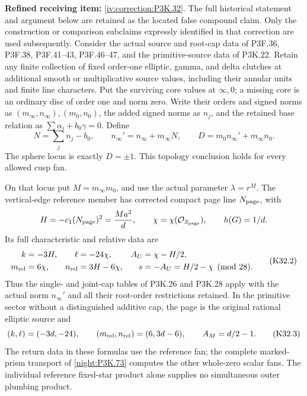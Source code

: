 \begin{theorem}\hypertarget{tag-02UD}{}\label{night:P3K.32}

\par\noindent\textbf{Refined receiving item:} \cref{iv:correction:P3K.32}. The full historical statement and argument below are retained as the located false compound claim. Only the construction or comparison subclaims expressly identified in that correction are used subsequently.
Consider the actual source and root-cap data of P3F.36, P3F.38,
P3F.41--43, P3F.46--47, and the primitive-source data of P3K.22.
Retain any finite collection of fixed order-one elliptic, gamma,
and delta clutches at additional smooth or multiplicative source
values, including their annular units and finite line characters.
Put the surviving core values at $\infty,0$; a missing core is
an ordinary disc of order one and norm zero. Write their orders
and signed norms as $(m_\infty,n_\infty),(m_0,n_0)$, the added
signed norms as $n_j$, and the retained base relation as
$\sum\alpha_i+b_0\gamma=0$. Define
\[
 N=\sum_jn_j-b_0,\qquad
 n_\infty'=n_\infty+m_\infty N,\qquad
 D=m_0n_\infty'+m_\infty n_0.                         \tag{K32.1}
\]
The sphere locus is exactly $D=\pm1$. This topology conclusion
holds for every allowed cusp fan.

On that locus put $M=m_\infty m_0$, and use the actual
parameter $\lambda=r^M$. The vertical-edge reference member
has corrected compact page line $N_{\rm page}$, with
\[
 H=-c_1(N_{\rm page})^2=\frac{Ma^2}{d},\qquad
 \chi=\chi(\mathcal O_{S_{\rm page}}),\qquad h(G)=1/d.
\]
Its full characteristic and relative data are
\[
 \begin{aligned}
 k&=-3H,&\ell&=-24\chi,& A_U&=\chi-H/2,\\
 m_{\rm rel}&=6\chi,&n_{\rm rel}&=3H-6\chi,
 &s&=-A_U=H/2-\chi\pmod {28}.                           
 \end{aligned}\tag{K32.2}
\]
Thus the single- and joint-cap tables of P3K.26 and P3K.28
apply with the actual norm $n_\infty'$ and all their root-order
restrictions retained. In the primitive sector without a
distinguished additive cap, the page is the original rational
elliptic source and
\[
 (k,\ell)=(-3d,-24),\qquad
 (m_{\rm rel},n_{\rm rel})=(6,3d-6),\qquad
 A_M=d/2-1.                                   \tag{K32.3}
\]
The return data in these formulas use the reference fan;
the complete marked-prism transport of \cref{night:P3K.73} computes the other whole-zero scalar fans. The individual reference fixed-star product alone supplies no simultaneous outer plumbing product.
\end{theorem}

